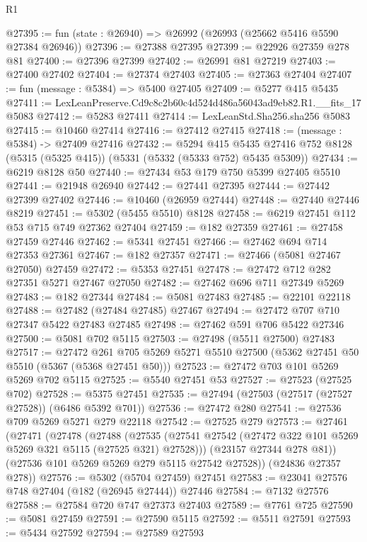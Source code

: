 \begin{lexlean}{R1}
\begin{coremodule}
@27395 := fun (state : @26940) => @26992 (@26993 (@25662 @5416 @5590 @27384 @26946))
@27396 := @27388 @27395
@27399 := @22926 @27359 @278 @81
@27400 := @27396 @27399
@27402 := @26991 @81 @27219
@27403 := @27400 @27402
@27404 := @27374 @27403
@27405 := @27363 @27404
@27407 := fun (message : @5384) => @5400 @27405
@27409 := @5277 @415 @5435
@27411 := LexLeanPreserve.Cd9c8c2b60c4d524d486a56043ad9eb82.R1.__fits_17 @5083
@27412 := @5283 @27411
@27414 := LexLeanStd.Sha256.sha256 @5083
@27415 := @10460 @27414
@27416 := @27412 @27415
@27418 := (message : @5384) -> @27409 @27416
@27432 := @5294
    @415
    @5435
    @27416
    @752
    @8128
    (@5315 (@5325 @415))
    (@5331 (@5332 (@5333 @752) @5435 @5309))
@27434 := @6219 @8128 @50
@27440 := @27434 @53 @179 @750 @5399 @27405 @5510
@27441 := @21948 @26940
@27442 := @27441 @27395
@27444 := @27442 @27399 @27402
@27446 := @10460 (@26959 @27444)
@27448 := @27440 @27446 @8219
@27451 := @5302 (@5455 @5510) @8128
@27458 := @6219 @27451 @112 @53 @715 @749 @27362 @27404
@27459 := @182 @27359
@27461 := @27458 @27459 @27446
@27462 := @5341 @27451
@27466 := @27462 @694 @714 @27353 @27361
@27467 := @182 @27357
@27471 := @27466 (@5081 @27467 @27050) @27459
@27472 := @5353 @27451
@27478 := @27472 @712 @282 @27351 @5271 @27467 @27050
@27482 := @27462 @696 @711 @27349 @5269
@27483 := @182 @27344
@27484 := @5081 @27483
@27485 := @22101 @22118
@27488 := @27482 (@27484 @27485) @27467
@27494 := @27472 @707 @710 @27347 @5422 @27483 @27485
@27498 := @27462 @591 @706 @5422 @27346
@27500 := @5081 @702 @5115
@27503 := @27498 (@5511 @27500) @27483
@27517 := @27472
    @261
    @705
    @5269
    @5271
    @5510
    @27500
    (@5362 @27451 @50 @5510 (@5367 (@5368 @27451 @50)))
@27523 := @27472 @703 @101 @5269 @5269 @702 @5115
@27525 := @5540 @27451 @53
@27527 := @27523 (@27525 @702)
@27528 := @5375 @27451
@27535 := @27494 (@27503 (@27517 (@27527 @27528)) (@6486 @5392 @701))
@27536 := @27472 @280
@27541 := @27536 @709 @5269 @5271 @279 @22118
@27542 := @27525 @279
@27573 := @27461
    (@27471
      (@27478
        (@27488
          (@27535 (@27541 @27542 (@27472 @322 @101 @5269 @5269 @321 @5115 (@27525 @321) @27528)))
          (@23157 @27344 @278 @81))
        (@27536 @101 @5269 @5269 @279 @5115 @27542 @27528))
      (@24836 @27357 @278))
@27576 := @5302 (@5704 @27459) @27451
@27583 := @23041 @27576 @748 @27404 (@182 (@26945 @27444)) @27446
@27584 := @7132 @27576
@27588 := @27584 @720 @747 @27373 @27403
@27589 := @7761 @725
@27590 := @5081 @27459
@27591 := @27590 @5115
@27592 := @5511 @27591
@27593 := @5434 @27592
@27594 := @27589 @27593

\end{coremodule}
\end{lexlean}
